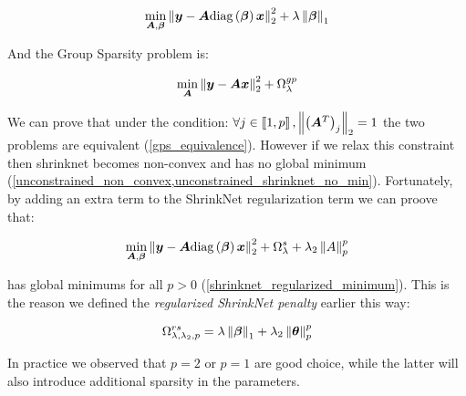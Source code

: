 \begin{equation}
  \min_{\bm{A}, \bm{\beta}} \left\lVert\bm{y} - \bm{A}\text{diag}\left(\bm{\beta}\right)\bm{x}\right\rVert_2^2 + \lambda \left\lVert\bm{\beta}\right\rVert_1
\end{equation}

And the Group Sparsity problem is:

\begin{equation}
  \min_{\bm{A}} \left\lVert\bm{y} - \bm{A}\bm{x}\right\rVert_2^2 + \Omega_\lambda^{gp}
\end{equation}

We can prove that under the condition: $\forall j\in \left\llbracket1, p\right\rrbracket,
\left\lVert\left(\bm{A}^T\right)_j\right\rVert_2 = 1$ the two problems are equivalent
(\cref{gps_equivalence}). However if we relax this constraint then shrinknet
becomes non-convex and has no global minimum
(\cref{unconstrained_non_convex,unconstrained_shrinknet_no_min}). Fortunately,
by adding an extra term to the ShrinkNet regularization term we can proove that:

\begin{equation}
  \min_{\bm{A}, \bm{\beta}} \left\lVert\bm{y} - \bm{A}\text{diag}\left(\bm{\beta}\right)\bm{x}\right\rVert_2^2 + \Omega_\lambda^s + \lambda_2\left\lVert A\right\rVert_p^p
\end{equation}

has global minimums for all $p>0$ (\cref{shrinknet_regularized_minimum}).
This is the reason we defined the \textit{regularized ShrinkNet penalty} earlier
this way:

\begin{equation}
  \Omega_{\lambda, \lambda_2, p}^{rs} = \lambda\left\lVert\bm{\beta}\right\rVert_1 + \lambda_2\left\lVert\bm\theta\right\rVert_p^p
\end{equation}

In practice we observed that $p=2$ or $p=1$ are good choice, while the latter
will also introduce additional sparsity in the parameters.



